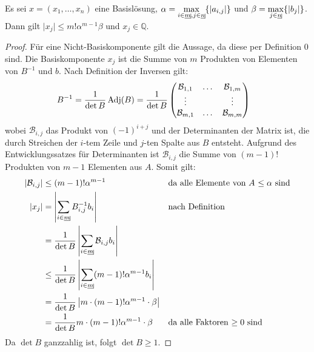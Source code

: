 \begin{lemma}
Es sei $x = (x_1,\dotsc,x_n)$ eine Basislösung, $\alpha = \max\limits_{i\in \laue{m},j\in \laue{n}}\{\lvert a_{i,j} \rvert\}$ und $\beta = \max\limits_{j\in \laue{n}}\{\lvert b_j \rvert\}$. Dann gilt $\lvert x_j \rvert \leq m!\alpha^{m-1}\beta$ und $x_j \in \mathbb Q$.
\end{lemma}
\begin{proof}
Für eine Nicht-Basiskomponente gilt die Aussage, da diese per Definition $0$ sind. Die Basiskomponente $x_j$ ist die Summe von $m$ Produkten von Elementen von $B^{-1}$ und $b$. Nach Definition der Inversen gilt:
\begin{align*}
B^{-1} = \frac{1}{\det B}\operatorname{Adj}(B) &= \frac{1}{\det B} \begin{pmatrix}
\mathcal B_{1,1} & \dots & \mathcal B_{1,m} \\
\vdots & \ & \vdots \\
\mathcal B_{m,1} & \dots & \mathcal B_{m,m}
\end{pmatrix}
\end{align*}
wobei $\mathcal B_{i,j}$ das Produkt von $(-1)^{i+j}$ und der Determinanten der Matrix ist, die durch Streichen der $i$-tem Zeile und $j$-ten Spalte aus $B$ entsteht.
Aufgrund des Entwicklungssatzes für Determinanten ist $\mathcal B_{i,j}$ die Summe von $(m-1)!$ Produkten von $m-1$ Elementen aus $A$. Somit gilt:
\begin{align*}
\lvert \mathcal B_{i,j} \rvert &\leq (m-1)!\alpha^{m-1} &&\text{da alle Elemente von $A$ $\leq \alpha$ sind}\\
\lvert x_j \rvert &= \left \lvert  \sum_{i \in \laue{m}} B^{-1}_{i,j} b_i \right \rvert &&\text{nach Definition}\\
&=\frac{1}{\det B}\left \lvert  \sum_{i \in \laue{m}} \mathcal B_{i,j} b_i \right \rvert \\
&\leq\frac{1}{\det B} \left \lvert  \sum_{i \in \laue{m}} (m-1)!\alpha^{m-1} b_i \right \rvert\\
&=\frac{1}{\det B}\left \lvert  m \cdot (m-1)!\alpha^{m-1} \cdot \beta \right \rvert \\
&=\frac{1}{\det B} m \cdot (m-1)!\alpha^{m-1} \cdot \beta &&\text{da alle Faktoren $\geq 0$ sind}
\end{align*}
Da $\det B$ ganzzahlig ist, folgt $\det B \geq 1$.
\end{proof}

